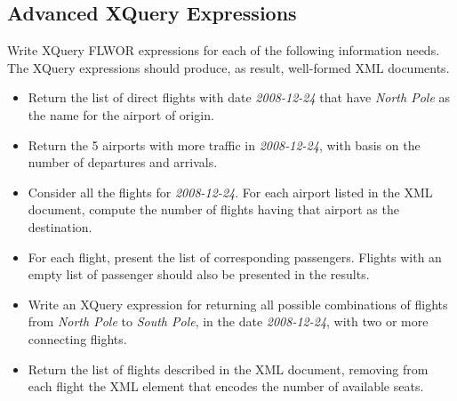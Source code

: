 \documentclass[12pt]{article}
\begin{document}
\subsection{Advanced XQuery Expressions}

Write XQuery FLWOR expressions for each of the following information needs. The XQuery expressions should produce, as result, well-formed XML documents.

\begin{itemize}
\item Return the list of direct flights with date {\it 2008-12-24} that have {\it North Pole} as the name for the airport of origin. 
\item Return the 5 airports with more traffic in {\it 2008-12-24}, with basis on the number of departures and arrivals.
\item Consider all the flights for {\it 2008-12-24}. For each airport listed in the XML document, compute the number of flights having that airport as the destination.
\item For each flight, present the list of corresponding passengers. Flights with an empty list of passenger should also be presented in the results. 
\item Write an XQuery expression for returning all possible combinations of flights from {\it North Pole} to {\it South Pole}, in the date {\it 2008-12-24}, with two or more connecting flights.
\item Return the list of flights described in the XML document, removing from each flight the XML element that encodes the number of available seats. 
\end{itemize}
\end{document}
